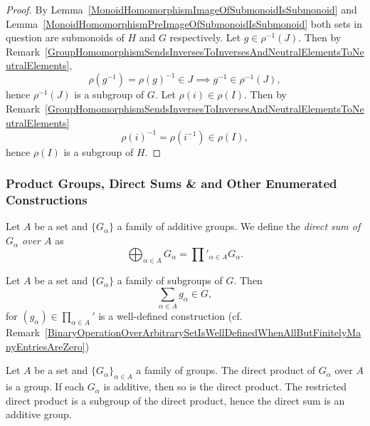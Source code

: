 \begin{proof}
    By Lemma~\ref{MonoidHomomorphismImageOfSubmonoidIsSubmonoid} and Lemma~\ref{MonoidHomomorphismPreImageOfSubmonoidIsSubmonoid} both sets in question are submonoids of $H$ and $G$ respectively. Let $g\in \rho^{-1}(J)$. Then by Remark~\ref{GroupHomomorphismSendsInversesToInversesAndNeutralElementsToNeutralElements},
    $$\rho\left(g^{-1}\right)  = \rho(g)^{-1} \in J \implies g^{-1}\in \rho^{-1}(J),$$
    hence $\rho^{-1}(J)$ is a subgroup of $G$. Let $\rho(i)\in \rho(I)$. Then by Remark~\ref{GroupHomomorphismSendsInversesToInversesAndNeutralElementsToNeutralElements}
    $$\rho(i)^{-1}=\rho\left(i^{-1}\right) \in \rho(I),$$
    hence $\rho(I)$ is a subgroup of $H$.
\end{proof}
\subsubsection{Product Groups, Direct Sums \& and Other Enumerated Constructions}
\begin{definition}
    Let $A$ be a set and $\{G_\alpha\}$ a family of additive groups. We define the \textit{direct sum of $G_\alpha$ over $A$} as 
    $$\bigoplus_{\alpha\in A} G_\alpha = \prod'_{\alpha\in A} G_\alpha.$$
\end{definition}
\begin{remark}\label{SumsOfInfinitelyOftenZeroGroupElements}
    Let $A$ be a set and $\{G_\alpha\}$ a family of subgroups of $G$. Then 
    $$\sum_{\alpha\in A} g_\alpha \in G,$$
    for $(g_\alpha)\in \prod_{\alpha\in A}'$ is a well-defined construction (cf. Remark~\ref{BinaryOperationOverArbitrarySetIsWellDefinedWhenAllButFinitelyManyEntriesAreZero})
\end{remark}
\begin{lemma}\label{DirectProductRestrictedDirectProductOfGroupsAreGroups}
    Let $A$ be a set and $\{G_\alpha\}_{\alpha \in A}$ a family of groups. The direct product of $G_\alpha$ over $A$ is a group. If each $G_\alpha$ is additive, then so is the direct product. The restricted direct product is a subgroup of the direct product, hence the direct sum is an additive group. 
\end{lemma}

